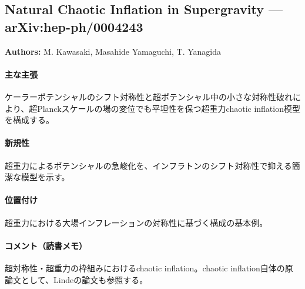 \subsection{Natural Chaotic Inflation in Supergravity --- arXiv:hep-ph/0004243}

\textbf{Authors:} M. Kawasaki, Masahide Yamaguchi, T. Yanagida

\paragraph{主な主張}
ケーラーポテンシャルのシフト対称性と超ポテンシャル中の小さな対称性破れにより、超Planckスケールの場の変位でも平坦性を保つ超重力chaotic inflation模型を構成する\cite{Kawasaki:2000yn}。

\paragraph{新規性}
超重力によるポテンシャルの急峻化を、インフラトンのシフト対称性で抑える簡潔な模型を示す。

\paragraph{位置付け}
超重力における大場インフレーションの対称性に基づく構成の基本例。

\paragraph{コメント（読書メモ）}
超対称性・超重力の枠組みにおけるchaotic inflation。chaotic inflation自体の原論文として、Lindeの論文\cite{Linde:1983gd}も参照する。
